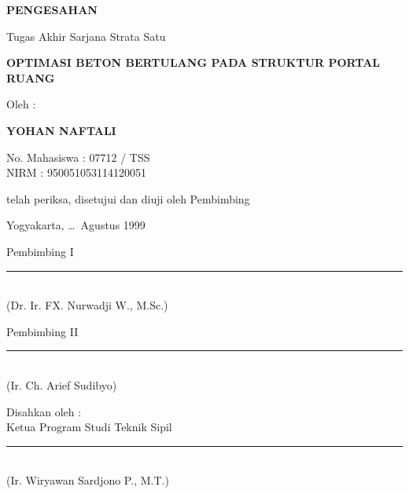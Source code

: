 \thispagestyle{empty}
\begin{center}
{\bfseries PENGESAHAN}

\vspace{1cm}
Tugas Akhir Sarjana Strata Satu

\vspace{0.3cm}
{\bfseries OPTIMASI BETON BERTULANG PADA STRUKTUR PORTAL RUANG}

\vspace{1.5cm}
Oleh :

\vspace{0.3cm}
{\bfseries YOHAN NAFTALI}

No. Mahasiswa : 07712 / TSS \\
NIRM : 950051053114120051

\vspace{1cm}
telah periksa, disetujui dan diuji oleh Pembimbing

\vspace{0.5cm}
Yogyakarta, \ldots\ Agustus 1999

\vspace{2.5cm}

\begin{minipage}{0.45\textwidth}
\centering
Pembimbing I

\vspace{2.5cm}
\rule{5cm}{0.4pt}\\
(Dr. Ir. FX. Nurwadji W., M.Sc.)
\end{minipage}%
\begin{minipage}{0.45\textwidth}
\centering
Pembimbing II

\vspace{2.5cm}
\rule{5cm}{0.4pt}\\
(Ir. Ch. Arief Sudibyo)
\end{minipage}

\vspace{2cm}
Disahkan oleh :\\
Ketua Program Studi Teknik Sipil

\vspace{2.5cm}
\rule{6cm}{0.4pt}\\
(Ir. Wiryawan Sardjono P., M.T.)

\end{center}
\clearpage

